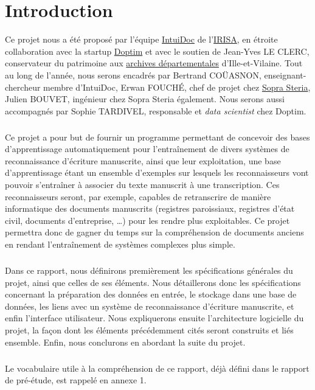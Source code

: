 \chapter{Introduction}
\setcounter{page}{1}
\pagestyle{fancy}
\fancyhf{}
\cfoot[\thepage]{\thepage}

Ce projet nous a été proposé par l’équipe \href{https://www-intuidoc.irisa.fr/}{IntuiDoc}
de l’\href{https://www.irisa.fr/}{IRISA}, en étroite collaboration avec la startup
\href{http://www.doptim.eu}{Doptim} et avec le soutien de Jean-Yves LE CLERC, conservateur du
patrimoine aux \href{http://archives.ille-et-vilaine.fr/fr}{archives départementales} d'Ille-et-Vilaine.
Tout au long de l’année, nous serons encadrés par Bertrand COÜASNON, enseignant-chercheur membre d'IntuiDoc,
Erwan FOUCHÉ, chef de projet chez \href{https://www.soprasteria.com/fr}{Sopra Steria}, Julien BOUVET,
ingénieur chez Sopra Steria également. Nous serons aussi accompagnés par Sophie TARDIVEL, responsable
et \textit{data scientist} chez Doptim.

\paragraph{}
Ce projet a pour but de fournir un programme permettant de concevoir des bases d’apprentissage
automatiquement pour l’entraînement de divers systèmes de reconnaissance d’écriture manuscrite,
ainsi que leur exploitation, une base d'apprentissage étant un ensemble
d'exemples sur lesquels les reconnaisseurs vont pouvoir s'entraîner à associer
du texte manuscrit à une transcription. Ces reconnaisseurs seront, par exemple,
capables de retranscrire de manière informatique des documents manuscrits
(registres paroissiaux, registres d’état civil, documents d’entreprise,
\ldots) pour les rendre plus exploitables. Ce projet permettra donc de gagner
du temps sur la compréhension de documents anciens en rendant l’entraînement
de systèmes complexes plus simple.

\paragraph{}
Dans ce rapport, nous définirons premièrement les spécifications générales du
projet, ainsi que celles de ses éléments. Nous détaillerons donc les
spécifications concernant la préparation des données en entrée, le stockage
dans une base de données, les liens avec un système de reconnaissance
d’écriture manuscrite, et enfin l’interface utilisateur. Nous expliquerons
ensuite l’architecture logicielle du projet, la façon dont les éléments
précédemment cités seront construits et liés ensemble. Enfin, nous conclurons
en abordant la suite du projet.

\paragraph{}
Le vocabulaire utile à la compréhension de ce rapport, déjà défini dans le
rapport de pré-étude, est rappelé en annexe 1.
